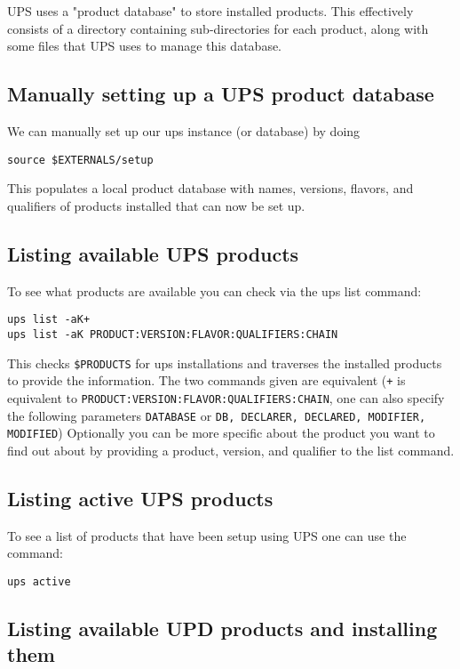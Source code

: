 \documentclass[letterpaper,10pt]{article}
\begin{document}
UPS uses a "product database" to store installed products. This effectively consists of a directory containing sub-directories for each product, along with some files that UPS uses to manage this database.

\subsection{Manually setting up a UPS product database}

We can manually set up our ups instance (or database) by doing 

\begin{verbatim}
source $EXTERNALS/setup
\end{verbatim}
\noindent

This populates a local product database with names, versions, flavors, and qualifiers of products installed that can now be set up. 

\subsection{Listing available UPS products}
To see what products are available you can check via the ups list command:

\begin{verbatim}
ups list -aK+
ups list -aK PRODUCT:VERSION:FLAVOR:QUALIFIERS:CHAIN
\end{verbatim}
\noindent

This checks \verb|$PRODUCTS| for ups installations and traverses the installed products to provide the information. The two commands given are equivalent (\verb|+| is equivalent to \verb|PRODUCT:VERSION:FLAVOR:QUALIFIERS:CHAIN|, one can also specify the following parameters \verb|DATABASE| or \verb|DB, DECLARER, DECLARED, MODIFIER, MODIFIED|) Optionally you can be more specific about the product you want to find out about by providing a product, version, and qualifier to the list command. 

\subsection{Listing active UPS products}
To see a list of products that have been setup using UPS one can use the command:
\begin{verbatim}
ups active
\end{verbatim}

\subsection{Listing available UPD products and installing them}
\end{document}
